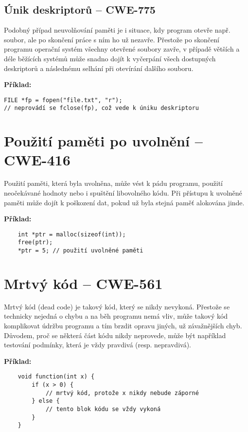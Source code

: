 \documentclass{article}
\begin{document}
\subsection*{Únik deskriptorů – CWE-775}

Podobný případ neuvolňování paměti je i situace, kdy program otevře např. soubor, ale po skončení práce s ním ho už nezavře. Přestože po skončení programu operační systém všechny otevřené soubory zavře, v případě větších a déle běžících systémů může snadno dojít k vyčerpání všech dostupných deskriptorů a následnému selhání při otevírání dalšího souboru.

\textbf{Příklad:}

\begin{verbatim}
FILE *fp = fopen("file.txt", "r");
// neprovádí se fclose(fp), což vede k úniku deskriptoru
\end{verbatim}

\section*{Použití paměti po uvolnění – CWE-416}

Použití paměti, která byla uvolněna, může vést k pádu programu, použití neočekávané hodnoty nebo i spuštění libovolného kódu. Při přístupu k uvolněné paměti může dojít k poškození dat, pokud už byla stejná paměť alokována jinde.

\textbf{Příklad:}
\begin{verbatim}
	int *ptr = malloc(sizeof(int));
	free(ptr);
	*ptr = 5; // použití uvolněné paměti
\end{verbatim}

\section*{Mrtvý kód – CWE-561}

Mrtvý kód (dead code) je takový kód, který se nikdy nevykoná. Přestože se technicky nejedná o chybu a na běh programu nemá vliv, může takový kód komplikovat údržbu programu a tím brzdit opravu jiných, už závažnějších chyb. Důvodem, proč se některá část kódu nikdy neprovede, může být například testování podmínky, která je vždy pravdivá (resp. nepravdivá).

\textbf{Příklad:}
\begin{verbatim}
	void function(int x) {
		if (x > 0) {
			// mrtvý kód, protože x nikdy nebude záporné
		} else {
			// tento blok kódu se vždy vykoná
		}
	}
\end{verbatim}
\end{document}
